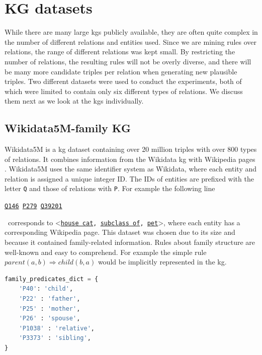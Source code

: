 \section{KG datasets}
While there are many large \glspl{kg} publicly available, they are often quite complex in the number of different relations and entities used. Since we are mining rules over relations, the range of different relations was kept small. By restricting the number of relations, the resulting rules will not be overly diverse, and there will be many more candidate triples per relation when generating new plausible triples. Two different datasets were used to conduct the experiments, both of which were limited to contain only six different types of relations. We discuss them next as we look at the \glspl{kg} individually.


\subsection{Wikidata5M-family KG}
Wikidata5M is a \gls{kg} dataset containing over 20 million triples with over 800 types of relations. It combines information from the Wikidata \gls{kg} with Wikipedia pages \cite{wang2019kepler}. Wikidata5M uses the same identifier system as Wikidata, where each entity and relation is assigned a unique integer ID. The IDs of entities are prefixed with the letter \texttt{Q} and those of relations with \texttt{P}. For example the following line \\
\centerline{\texttt{\href{https://www.wikidata.org/wiki/Q146}{Q146} \quad \href{https://www.wikidata.org/wiki/Property:P279}{P279} \quad  \href{https://www.wikidata.org/wiki/Q39201}{Q39201}}} \
corresponds to \textless\texttt{\href{https://www.wikidata.org/wiki/Q146}{house cat}, \href{https://www.wikidata.org/wiki/Property:P279}{subclass of}, \href{https://www.wikidata.org/wiki/Q39201}{pet}}\textgreater, where each entity has a corresponding Wikipedia page.
This dataset was chosen due to its size and because it contained family-related information. Rules about family structure are well-known and easy to comprehend. For example the simple rule $parent(a, b) \Rightarrow  child(b, a)$ would be implicitly represented in the \gls{kg}.
\begin{lstlisting}[float, language=Python, caption={Python dictionary converting family predicate IDs to their names.},captionpos=t, label={family_predicated_dict}]
family_predicates_dict = {
    'P40': 'child', 
    'P22' : 'father', 
    'P25' : 'mother',
    'P26' : 'spouse', 
    'P1038' : 'relative', 
    'P3373' : 'sibling', 
}
\end{lstlisting}

